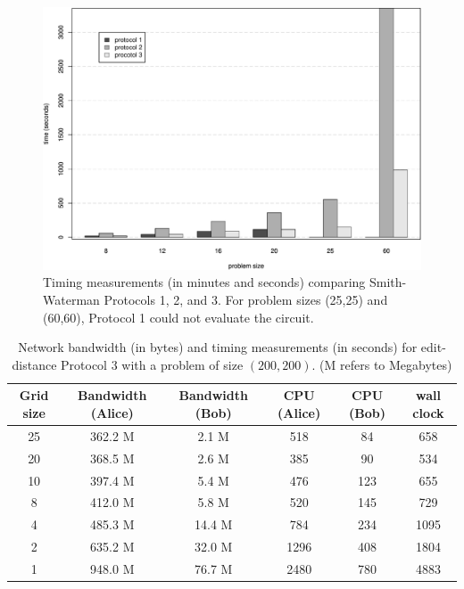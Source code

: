 \begin{figure}
\centerline{\includegraphics[scale=0.6,angle=0]{genomics/sw123}}

\caption{Timing measurements (in minutes and seconds) comparing Smith-Waterman
Protocols 1, 2, and 3. For problem sizes (25,25) and (60,60), Protocol
1 could not evaluate the circuit.}

\label{fig:sw-histogram} 
\end{figure}

\begin{table}
\begin{centering}
\begin{tabular}{|c||c|c|c|c|c|}
\hline 
Grid size &
Bandwidth (Alice) &
Bandwidth (Bob) &
CPU (Alice) &
CPU (Bob) &
wall clock \tabularnewline
\hline
\hline 
25 &
362.2 M &
2.1 M &
518 &
84 &
658 \tabularnewline
\hline 
20 &
368.5 M &
2.6 M &
385 &
90 &
534 \tabularnewline
\hline 
10 &
397.4 M &
5.4 M &
476 &
123 &
655 \tabularnewline
\hline 
8 &
412.0 M &
5.8 M &
520 &
145 &
729 \tabularnewline
\hline 
4 &
485.3 M &
14.4 M &
784 &
234 &
1095 \tabularnewline
\hline 
2 &
635.2 M&
32.0 M&
1296 &
408 &
1804 \tabularnewline
\hline 
1&
948.0 M&
76.7 M&
2480 &
780 &
4883 \tabularnewline
\hline
\end{tabular}
\par\end{centering}

\caption{Network bandwidth (in bytes) and timing measurements (in seconds)
for edit-distance Protocol 3 with a problem of size $(200,200)$.
(M refers to Megabytes)}

\label{protocol3table200} 
\end{table}




